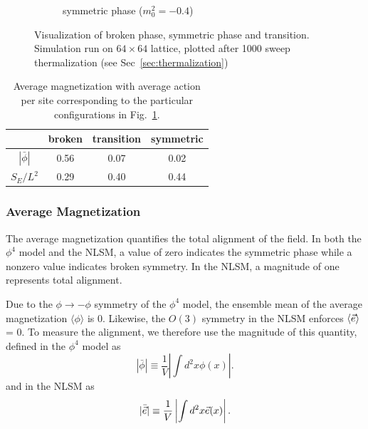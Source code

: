 \begin{figure}[h]
\begin{center}
\begin{subfigure}[b]{0.3\textwidth}
        \caption{symmetric phase ($m_0^2=-0.4$)}
      \end{subfigure}
      \hfill
      \caption{\label{fig:primary observables} Visualization of broken phase, symmetric phase and transition. Simulation run on $64\times64$ lattice, plotted after 1000 sweep thermalization (see Sec~\ref{sec:thermalization})}
  \end{center}
\end{figure}

\begin{table}[h]
    \begin{center}
    {\renewcommand{\arraystretch}{1.2} %
    \begin{tabular}{c c c c}
        \hline\hline & broken & transition & symmetric \\ \hline
        $|\bar\phi|$ & 0.56 & 0.07 & 0.02 \\ 
        $S_E/L^2$ & 0.29 & 0.40 & 0.44  \\ \hline\hline
    \end{tabular}}

    \end{center}
    \caption{\label{tab:primary observables} Average magnetization with average action per site corresponding to the particular configurations in Fig.~\ref{fig:primary observables}.}
\end{table}

\subsubsection{Average Magnetization}
\label{sec:avg mag}
The average magnetization quantifies the total alignment of the field. In both the $\phi^4$ model and the NLSM, a value of zero indicates the symmetric phase while a nonzero value indicates broken symmetry. In the NLSM, a magnitude of one represents total alignment.

Due to the $\phi\rightarrow-\phi$ symmetry of the $\phi^4$ model, the ensemble mean of the average magnetization $\langle \phi \rangle$ is $0$. Likewise, the $O(3)$ symmetry in the NLSM enforces $\langle \vec e \rangle$ = 0. To measure the alignment, we therefore use the magnitude of this quantity, defined in the $\phi^4$ model as 
\begin{equation}
|\bar\phi| \equiv \frac{1}{V}\left| \int d^2x \phi(x)\right|.
\end{equation}
and in the NLSM as
\begin{equation}
    \label{eq:chim nlsm}
    |\bar{\vec e}| \equiv \frac{1}{V}\left|\int d^2x \vec e(x)\right|.
\end{equation}

